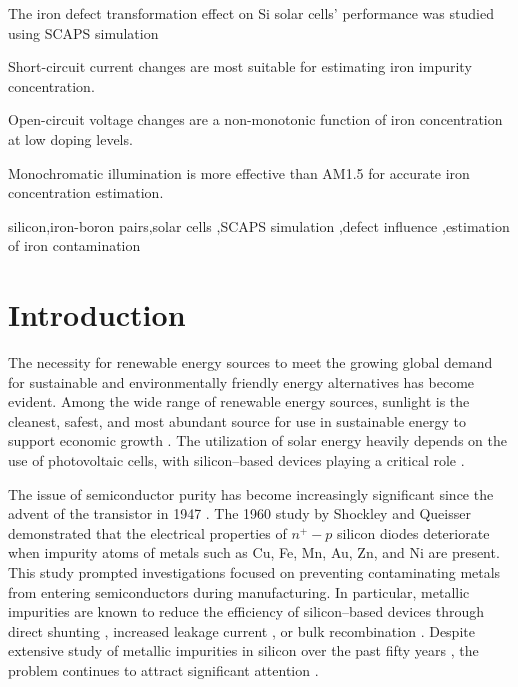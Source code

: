 \documentclass[a4paper,fleqn]{cas-sc}
\begin{document}

\begin{highlights}
\item The iron defect transformation effect on Si solar cells' performance was studied using SCAPS simulation
\item Short-circuit current changes are most suitable for estimating iron impurity concentration.
\item Open-circuit voltage changes are a non-monotonic function of iron concentration at low doping levels.
\item Monochromatic illumination is more effective than AM1.5 for accurate iron concentration estimation.
\end{highlights}


\begin{keywords}
 silicon\sep iron-boron pairs\sep solar cells \sep SCAPS simulation \sep defect influence \sep estimation of iron contamination
\end{keywords}

\maketitle

\section{Introduction}%
\par
The necessity for renewable energy sources to meet the growing global demand for sustainable and environmentally friendly energy alternatives has become evident.
Among the wide range of renewable energy sources, sunlight is the cleanest, safest,
and most abundant source for use in sustainable energy to support economic growth \cite{PratapSingh2019}.
The utilization of solar energy heavily depends on the use of photovoltaic cells, with silicon--based devices playing a critical role \cite{Basnet2024,Wang2024}.


The issue of semiconductor purity has become increasingly significant since the advent of the transistor in 1947 \cite{Claers2018}.
The 1960 study by Shockley and Queisser \cite{Goetzberger1960} demonstrated that
the electrical properties of $n^{+}-p$ silicon diodes deteriorate when impurity atoms of metals such as Cu, Fe, Mn, Au, Zn, and Ni are present.
This study prompted investigations focused on preventing contaminating metals from entering semiconductors during manufacturing.
In particular, metallic impurities are known to reduce the efficiency of
silicon--based devices through direct shunting \cite{Rsh:Breitenstein},
increased leakage current \cite{Lee1980},
or bulk recombination \cite{Istratov2000}.
Despite extensive study of metallic impurities in silicon over the past fifty years \cite{Claers2018,Pearce1977},
the problem continues to attract significant attention \cite{Hajjiah2020,Le2024,Maoudj2021,OlikhPSSA,LaineIEEEPV2016}.
\end{document}
